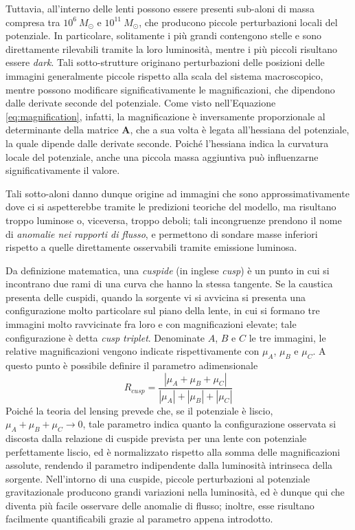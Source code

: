 Tuttavia, all'interno delle lenti possono essere presenti sub-aloni di massa compresa tra $10^6\ M_\odot$ e $10^{11}\ M_\odot$, che producono piccole perturbazioni locali del potenziale. In particolare, solitamente i più grandi contengono stelle e sono direttamente rilevabili tramite la loro luminosità, mentre i più piccoli risultano essere \emph{dark}. Tali sotto-strutture originano perturbazioni delle posizioni delle immagini generalmente piccole rispetto alla scala del sistema macroscopico, mentre possono modificare significativamente le magnificazioni, che dipendono dalle derivate seconde del potenziale. 
Come visto nell'Equazione \ref{eq:magnification}, infatti, la magnificazione è inversamente proporzionale al determinante della matrice $\mathbf{A}$, che a sua volta è legata all'hessiana del potenziale, la quale dipende dalle derivate  seconde.
Poiché l'hessiana indica la curvatura locale del potenziale, anche una piccola massa aggiuntiva può influenzarne significativamente il valore. 

Tali sotto-aloni danno dunque origine ad immagini che sono approssimativamente dove ci si aspetterebbe tramite le predizioni teoriche del modello, ma risultano troppo luminose o, viceversa, troppo deboli; tali incongruenze prendono il nome di \emph{anomalie nei rapporti di flusso}, e permettono di sondare masse inferiori rispetto a quelle direttamente osservabili tramite emissione luminosa.

Da definizione matematica, una \emph{cuspide} (in inglese \emph{cusp}) è un punto in cui si incontrano due rami di una curva che hanno la stessa tangente. Se la caustica presenta delle cuspidi, quando la sorgente vi si avvicina si presenta una configurazione molto particolare sul piano della lente, in cui si formano tre immagini molto ravvicinate fra loro e con magnificazioni elevate; tale configurazione è detta \emph{cusp triplet}. Denominate $A$, $B$ e $C$ le tre immagini, le relative magnificazioni vengono indicate rispettivamente con $\mu_A$, $\mu_B$ e $\mu_C$. A questo punto è possibile definire il parametro adimensionale
\begin{equation}
    R_{cusp}=\frac{|\mu_A+\mu_B+\mu_C|}{|\mu_A|+|\mu_B|+|\mu_C|}
\end{equation}
Poiché la teoria del lensing prevede che, se il potenziale è liscio, $\mu_A+\mu_B+\mu_C \to 0$, tale parametro indica quanto la configurazione osservata si discosta dalla relazione di cuspide prevista per una lente con potenziale perfettamente liscio, ed è normalizzato rispetto alla somma delle magnificazioni assolute, rendendo il parametro indipendente dalla luminosità intrinseca della sorgente.
Nell'intorno di una cuspide, piccole perturbazioni al potenziale gravitazionale producono grandi variazioni nella luminosità, ed è dunque qui che diventa più facile osservare delle anomalie di flusso; inoltre, esse risultano facilmente quantificabili grazie al parametro appena introdotto. 

